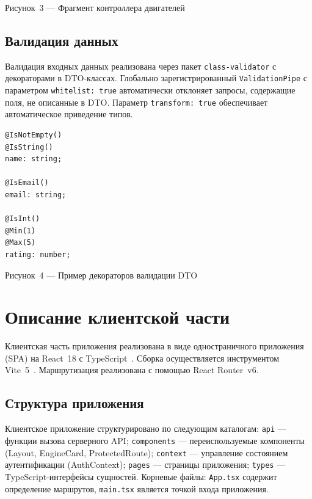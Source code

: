 \documentclass[14pt,a4paper]{extarticle}
\begin{document}
\begin{center}
  Рисунок~3 --- Фрагмент контроллера двигателей
\end{center}

\subsection{Валидация данных}

Валидация входных данных реализована через пакет \texttt{class-validator} с декораторами в DTO-классах. Глобально зарегистрированный \texttt{ValidationPipe} с параметром \texttt{whitelist:~true} автоматически отклоняет запросы, содержащие поля, не описанные в DTO. Параметр \texttt{transform:~true} обеспечивает автоматическое приведение типов.

\begin{lstlisting}
@IsNotEmpty()
@IsString()
name: string;

@IsEmail()
email: string;

@IsInt()
@Min(1)
@Max(5)
rating: number;
\end{lstlisting}

\begin{center}
  Рисунок~4 --- Пример декораторов валидации DTO
\end{center}

\newpage

\section{Описание клиентской части}

Клиентская часть приложения реализована в виде одностраничного приложения (SPA) на React~18 с TypeScript~\cite{typescript}. Сборка осуществляется инструментом Vite~5~\cite{vite}. Маршрутизация реализована с помощью React Router~v6.

\subsection{Структура приложения}

Клиентское приложение структурировано по следующим каталогам: \texttt{api} --- функции вызова серверного API; \texttt{components} --- переиспользуемые компоненты (Layout, EngineCard, ProtectedRoute); \texttt{context} --- управление состоянием аутентификации (AuthContext); \texttt{pages} --- страницы приложения; \texttt{types} --- TypeScript-интерфейсы сущностей. Корневые файлы: \texttt{App.tsx} содержит определение маршрутов, \texttt{main.tsx} является точкой входа приложения.
\end{document}
